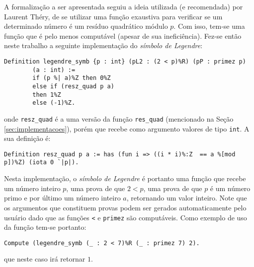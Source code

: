 A formalização a ser apresentada seguiu a ideia utilizada (e recomendada) por Laurent Théry, de se utilizar uma função exaustiva para verificar se um determinado número é um resíduo quadrático módulo $p$. Com isso, tem-se uma função que é pelo menos computável (apesar de sua ineficiência). Fez-se então neste trabalho a seguinte implementação do \textit{símbolo de Legendre}:
        \begin{lstlisting}[language=coq,frame=single,tabsize=1]
Definition legendre_symb {p : int} (pL2 : (2 < p)%R) (pP : primez p) 
        (a : int) :=
        if (p %| a)%Z then 0%Z
        else if (resz_quad p a)
        then 1%Z
        else (-1)%Z.
        \end{lstlisting}
onde \lstinline[language=coq]|resz_quad| é a uma versão da função \lstinline[language=coq]|res_quad| (mencionado na Seção \ref{sec:implementacoes}), porém que recebe como argumento valores de tipo \lstinline[language=coq]|int|. A sua definição é:
        \begin{lstlisting}[language=coq,frame=single,tabsize=1]
Definition resz_quad p a := has (fun i => ((i * i)%:Z  == a %[mod p])%Z) (iota 0 `|p|).
        \end{lstlisting}
Nesta implementação, o \textit{símbolo de Legendre} é portanto uma função que recebe um número inteiro $p$, uma prova de que $2 < p$, uma prova de que $p$ é um número primo e por último um número inteiro $a$, retornando um valor inteiro. Note que os argumentos que constituem provas podem ser gerados automaticamente pelo usuário dado que as funções \lstinline[language=coq]!<! e \lstinline[language=coq]!primez! são computáveis. Como exemplo de uso da função tem-se portanto:
        \begin{lstlisting}[language=coq,frame=single,tabsize=1]
Compute (legendre_symb (_ : 2 < 7)%R (_ : primez 7) 2).
        \end{lstlisting}
que neste caso irá retornar $1$.

